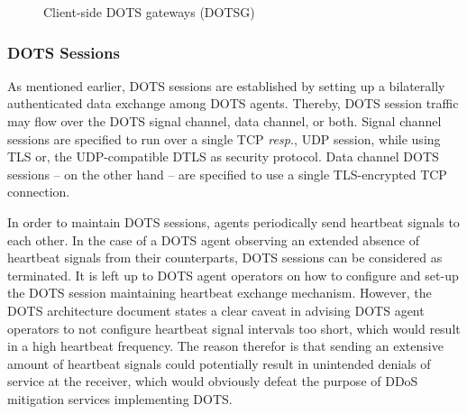 \begin{figure}[H]
\centering
{}
\hfill
{} 
\caption{Client-side DOTS gateways (DOTSG) \cite{dots-architecture}}
\end{figure}

\subsubsection{DOTS Sessions}
As mentioned earlier, DOTS sessions are established by setting up a bilaterally authenticated data exchange among DOTS agents. Thereby, DOTS session traffic may flow over the DOTS signal channel, data channel, or both. Signal channel sessions are specified to run over a single TCP \emph{resp.}, UDP session, while using TLS or, the UDP-compatible DTLS as security protocol. Data channel DOTS sessions -- on the other hand -- are specified to use a single TLS-encrypted TCP connection.

In order to maintain DOTS sessions, agents periodically send heartbeat signals to each other. In the case of a DOTS agent observing an extended absence of heartbeat signals from their counterparts, DOTS sessions can be considered as terminated. It is left up to DOTS agent operators on how to configure and set-up the DOTS session maintaining heartbeat exchange mechanism. However, the DOTS architecture document states a clear caveat in advising DOTS agent operators to not configure heartbeat signal intervals too short, which would result in a high heartbeat frequency. The reason therefor is that sending an extensive amount of heartbeat signals could potentially result in unintended denials of service at the receiver, which would obviously defeat the purpose of DDoS mitigation services implementing DOTS.
